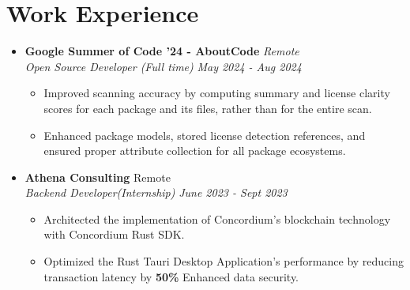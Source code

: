 \documentclass[legalpaper,10.8pt]{article}
\begin{document}
\section{Work Experience}
\begin{itemize}[leftmargin=*]

\item \textbf{Google Summer of Code '24 - AboutCode}  \hfill \textit{Remote} \\
\textit{Open Source Developer (Full time)}  \hfill \textit{May 2024 - Aug 2024}
\begin{itemize}[label=$\diamond$]
    \item \small Improved scanning accuracy by computing summary and license clarity scores for each package and its files, rather than for the entire scan.
    \item Enhanced package models, stored license detection references, and ensured proper attribute collection for all package ecosystems.
\end{itemize}

\item \textbf {Athena Consulting} \hfill Remote \\[3.75pt]
\textit{Backend Developer(Internship)} \hfill \textit{June 2023 - Sept 2023}
\begin{itemize}[label=$\diamond$]
    \item \small Architected the implementation of Concordium's blockchain technology with Concordium Rust SDK.
    \item \small Optimized the Rust Tauri Desktop Application's performance by reducing transaction latency by \textbf{50\%} Enhanced data security.
\end{itemize}
\end{itemize}
\end{document}
